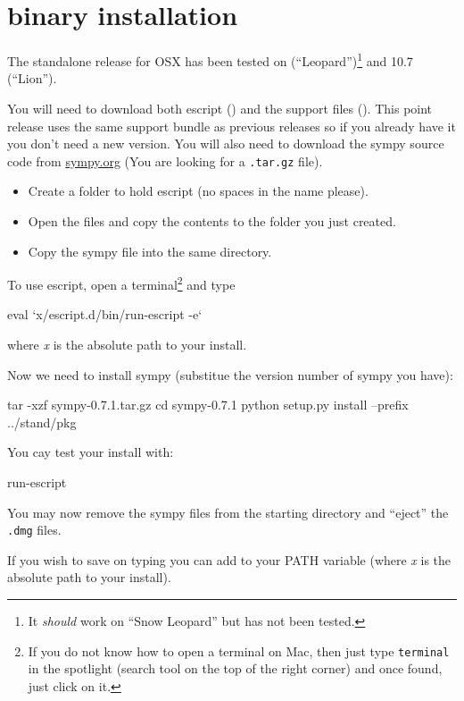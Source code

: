 %
%
%

\section{\macosx binary installation}
\label{sec:binmac}

The standalone release for OSX has been tested on  (``Leopard'')\footnote{It \emph{should} work on 
``Snow Leopard'' but has not been tested.} and 10.7 (``Lion'').

You will need to download both escript () and the support files ().
This point release uses the same support bundle as previous releases so if you already have it you don't need a new version.
You will also need to download the sympy source code from \url{sympy.org} (You are looking for a \texttt{.tar.gz} file).

\begin{itemize}
\item Create a folder to hold escript (no spaces in the name please).
\item Open the  files and copy the contents to the folder you just created.
\item Copy the sympy file into the same directory.
\end{itemize}

To use escript, open a terminal\footnote{If you do not know how to open a terminal on Mac, then just type \texttt{terminal} in the spotlight (search tool on the top of the right corner) and once found, just click on it.} and type
\begin{shellCode}
eval `x/escript.d/bin/run-escript -e`
\end{shellCode}
where \textit{x} is the absolute path to your install.

\noindent Now we need to install sympy (substitue the version number of sympy you have):
\begin{shellCode}
tar -xzf sympy-0.7.1.tar.gz
cd sympy-0.7.1
python setup.py install --prefix ../stand/pkg
\end{shellCode}

You cay test your install with:
\begin{shellCode}
run-escript
\end{shellCode}

You may now remove the sympy files from the starting directory and ``eject'' the \texttt{.dmg} files.

If you wish to save on typing you can add  to your PATH variable 
(where \textit{x} is the absolute path to your install). 

